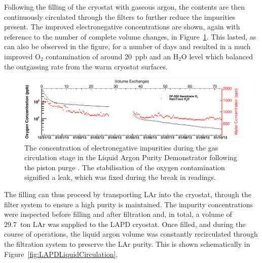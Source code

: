 Following the filling of the cryostat with gaseous argon, the contents are then continuously circulated through the filters to further reduce the impurities present.  The improved electronegative concentrations are shown, again with reference to the number of complete volume changes, in Figure~\ref{fig:LAPDGasCirculation}.  This lasted, as can also be observed in the figure, for a number of days and resulted in a much improved O$_2$ contamination of around 20~ppb and an H$_2$O level which balanced the outgassing rate from the warm cryostat surfaces.

\begin{figure}
  \centering
  \includegraphics[width=0.7\linewidth]{LAPDGasCirculation.pdf}
  \caption[The concentration of electronegative impurities during the gas circulation stage in the Liquid Argon Purity Demonstrator following the piston purge.]{The concentration of electronegative impurities during the gas circulation stage in the Liquid Argon Purity Demonstrator following the piston purge \cite{LAPDJINST2014}.  The stabilisation of the oxygen contamination signified a leak, which was fixed during the break in readings.}
  \label{fig:LAPDGasCirculation}
\end{figure}

The filling can thus proceed by transporting LAr into the cryostat, through the filter system to ensure a high purity is maintained.  The impurity concentrations were inspected before filling and after filtration and, in total, a volume of 29.7~ton LAr was supplied to the LAPD cryostat.  Once filled, and during the course of operations, the liquid argon volume was constantly recirculated through the filtration system to preserve the LAr purity.  This is shown schematically in Figure~\ref{fig:LAPDLiquidCirculation}.

